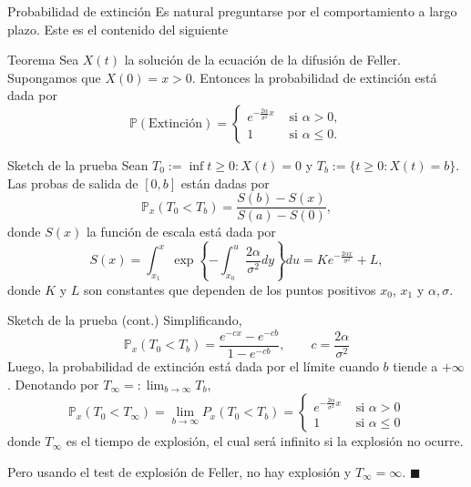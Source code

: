 \documentclass{beamer}
\renewcommand{\to}{\rightarrow}
\renewcommand{\P}{\mathbb{P}}
\renewcommand{\1}{\mathds{1}}
\theoremstyle{definition}
\theoremstyle{definition}
\theoremstyle{definition}
\theoremstyle{definition}
\theoremstyle{definition}
\begin{document}
\begin{frame}{Probabilidad de extinción}
    Es natural preguntarse por el comportamiento a largo plazo. Este es el contenido del siguiente\\
    \begin{block}{Teorema}
        Sea $X(t)$ la solución de la ecuación de la difusión de Feller. Supongamos que $X(0)=x>0$. Entonces 
        la probabilidad de extinción está dada por 
        \[
        \P\left(\text{Extinción}\right)=
        \begin{cases}
            e^{-\frac{2\alpha}{\sigma^2}x} & \text{ si } \alpha>0,\\
            1 & \text{ si } \alpha\leq 0.
        \end{cases}
        \] 
    \end{block}
\end{frame}
\begin{frame}{Sketch de la prueba}
    Sean $T_0:=\inf{t\geq0 : X(t)=0}$ y $T_b:=\{t\geq0:X(t)=b\}$. Las probas de salida
    de $[0,b]$ están dadas por 
    \[
    \P_x\left(T_0<T_b\right)=\frac{S(b)-S(x)}{S(a)-S(0)},
    \]
    donde $S(x)$ la función de escala está dada por 
    \[
    S(x)=\int_{x_1}^{x}\exp \left\{-\int_{x_0}^{u}\frac{2\alpha}{\sigma^2}dy\right\}du=Ke^{-\frac{2\alpha x}{\sigma^2}}+L,
    \]
    donde $K$ y $L$ son constantes que dependen de los puntos positivos $x_0$, $x_1$ y $\alpha, \sigma$.
\end{frame}
\begin{frame}{Sketch de la prueba (cont.)}
    Simplificando, 
    \[
        \P_x(T_0<T_b)=\frac{e^{-cx}-e^{-cb}}{1-e^{-cb}}, \qquad c=\frac{2\alpha}{\sigma^2}
    \]  
    Luego, la probabilidad de extinción está dada por el límite cuando $b$ tiende a $+\infty$. Denotando
    por $T_\infty=:\lim_{b\to\infty}T_b$,
    \[
        \P_x(T_0<T_\infty)=\lim_{b\to\infty} P_x(T_0<T_b)=\begin{cases}
            e^{-\frac{2\alpha}{\sigma^2}x} & \text{ si } \alpha>0\\
            1 & \text{ si } \alpha\leq 0
        \end{cases}
    \]
    donde $T_\infty$ es el tiempo de explosión, el cual será infinito si la explosión no ocurre.
    \newline

    Pero usando el test de explosión de Feller, no hay explosión y $T_\infty=\infty$. $\blacksquare$
\end{frame}
\end{document}
